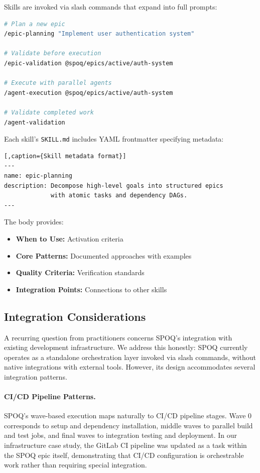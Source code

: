 Skills are invoked via slash commands that expand into full prompts:
\begin{lstlisting}[language=bash,caption={Skill invocation examples}]
# Plan a new epic
/epic-planning "Implement user authentication system"

# Validate before execution
/epic-validation @spoq/epics/active/auth-system

# Execute with parallel agents
/agent-execution @spoq/epics/active/auth-system

# Validate completed work
/agent-validation
\end{lstlisting}

Each skill's \texttt{SKILL.md} includes YAML frontmatter specifying metadata:

\needspace{6cm}
\begin{lstlisting}[,caption={Skill metadata format}]
---
name: epic-planning
description: Decompose high-level goals into structured epics
             with atomic tasks and dependency DAGs.
---
\end{lstlisting}

The body provides:
\begin{itemize}
    \item \textbf{When to Use:} Activation criteria
    \item \textbf{Core Patterns:} Documented approaches with examples
    \item \textbf{Quality Criteria:} Verification standards
    \item \textbf{Integration Points:} Connections to other skills
\end{itemize}

\needspace{6cm}
\subsection{Integration Considerations}
\label{subsec:integration-detail}
\label{subsec:tooling-integration}

A recurring question from practitioners concerns SPOQ's integration
with existing development infrastructure. We address this honestly:
SPOQ currently operates as a standalone orchestration layer invoked
via slash commands, without native integrations with external tools.
However, its design accommodates several integration patterns.

\paragraph{CI/CD Pipeline Patterns.}
SPOQ's wave-based execution maps naturally to CI/CD pipeline stages.
Wave 0 corresponds to setup and dependency installation, middle waves
to parallel build and test jobs, and final waves to integration testing
and deployment. In our infrastructure case study, the GitLab CI pipeline
was updated as a task within the SPOQ epic itself, demonstrating that
CI/CD configuration is orchestrable work rather than requiring special
integration.


